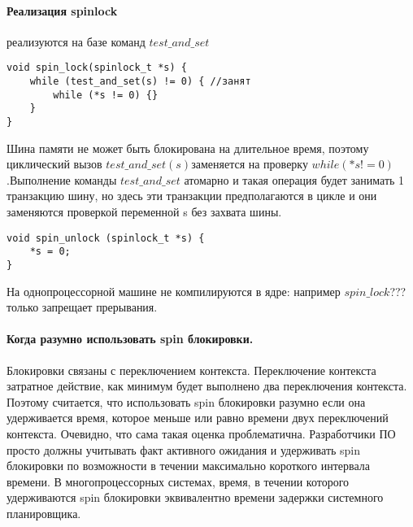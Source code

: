 \paragraph{Реализация spinlock}

реализуются на базе команд $test\_and\_set$

\begin{lstlisting}[label=impl_spin_lock, caption=Реализация spin\_lock]
void spin_lock(spinlock_t *s) {
	while (test_and_set(s) != 0) { //занят
		while (*s != 0) {}
	}
}
\end{lstlisting}

Шина памяти не может быть блокирована на длительное время, поэтому циклический вызов $test\_and\_set(s) $заменяется на проверку $while (*s != 0)$ .Выполнение команды $test\_and\_set$ атомарно и такая операция будет занимать 1 транзакцию шину, но здесь эти транзакции предполагаются в цикле и они заменяются проверкой переменной s  без захвата шины. 

\begin{lstlisting}[label=impl_spin_unlock, caption=Реализация spin\_unlock]
void spin_unlock (spinlock_t *s) {
	*s = 0;
}
\end{lstlisting}

На однопроцессорной машине не компилируются в ядре: например $spin\_lock$??? только запрещает прерывания. 

\paragraph{Когда разумно использовать spin блокировки.}

Блокировки связаны с переключением контекста. Переключение контекста затратное действие, как минимум будет выполнено два переключения контекста. Поэтому считается, что использовать spin блокировки разумно если она удерживается время, которое меньше или равно времени двух переключений контекста. Очевидно, что сама такая оценка проблематична.
Разработчики ПО просто должны учитывать факт активного ожидания и удерживать spin блокировки по возможности в течении максимально короткого интервала времени. В многопроцессорных системах, время, в течении которого удерживаются spin блокировки эквивалентно времени задержки системного планировщика.

